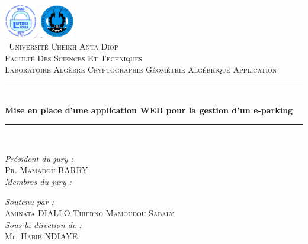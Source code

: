 \documentclass[12pt, openany]{report}
\newcommand{\HRule}{\rule{\linewidth}{0.5mm}}
\begin{document}
\begin{titlepage}
  \begin{sffamily}
 \begin{center}

     \includegraphics[height=1.5cm,width=1.5cm]{logo/1.PNG} \hspace{8.5cm}
     \includegraphics[height=1.5cm,width=1.5cm]{logo/2.PNG} \\

        \textsc{\ Université Cheikh Anta Diop \\Faculté Des Sciences Et Techniques\\Laboratoire Algèbre Cryptographie Géométrie Algébrique Application}\\[1.5cm]





      \HRule \\[0.4cm]
          { \huge \bfseries Mise en place d'une application WEB pour la gestion d'un e-parking\\[0.4cm] }
       \HRule \\[0.2cm]


    \begin{minipage}{0.4\textwidth}
      \begin{flushleft} \large
        \emph{Président du jury :}
               \\ \textsc{Pr. Mamadou BARRY}\\
      \emph{Membres du jury :}
     

      \end{flushleft}
       \hspace{10.5cm}
    \end{minipage}
    \begin{minipage}{0.4\textwidth}
      \begin{flushright} \large
       \emph{Soutenu par :}
         \\ \textsc{Aminata DIALLO
         \newline
         Thierno Mamoudou Sabaly 
              }\\
   \emph{Sous la direction de :}
   \\ Mr. \textsc{Habib NDIAYE}\\




\end{flushright}
\end{minipage}
\end{center}
\end{sffamily}
\end{titlepage}
\end{document}
